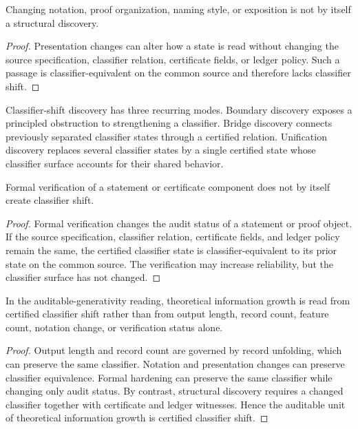 \begin{corollary}
\label{cor:philosophy-presentation-change-not-discovery}
Changing notation, proof organization, naming style, or exposition is not
by itself a structural discovery.
\end{corollary}
\begin{proof}
Presentation changes can alter how a state is read without changing the
source specification, classifier relation, certificate fields, or ledger
policy. Such a passage is classifier-equivalent on the common source and
therefore lacks classifier shift.
\end{proof}

\begin{definition}
\label{def:philosophy-discovery-modes}
Classifier-shift discovery has three recurring modes. Boundary discovery
exposes a principled obstruction to strengthening a classifier. Bridge
discovery connects previously separated classifier states through a
certified relation. Unification discovery replaces several classifier
states by a single certified state whose classifier surface accounts for
their shared behavior.
\end{definition}

\begin{theorem}
\label{thm:philosophy-formal-hardening-not-classifier-shift}
Formal verification of a statement or certificate component does not by
itself create classifier shift.
\end{theorem}
\begin{proof}
Formal verification changes the audit status of a statement or proof
object. If the source specification, classifier relation, certificate
fields, and ledger policy remain the same, the certified classifier state
is classifier-equivalent to its prior state on the common source. The
verification may increase reliability, but the classifier surface has not
changed.
\end{proof}

\begin{theorem}
\label{thm:philosophy-classifier-shift-information-principle}
In the auditable-generativity reading, theoretical information growth is
read from certified classifier shift rather than from output length,
record count, feature count, notation change, or verification status
alone.
\end{theorem}
\begin{proof}
Output length and record count are governed by record unfolding, which
can preserve the same classifier. Notation and presentation changes can
preserve classifier equivalence. Formal hardening can preserve the same
classifier while changing only audit status. By contrast, structural
discovery requires a changed classifier together with certificate and
ledger witnesses. Hence the auditable unit of theoretical information
growth is certified classifier shift.
\end{proof}


